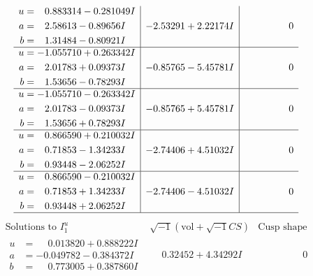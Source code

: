 \documentclass[1p]{elsarticle_modified}
\theoremstyle{definition}
\newcommand{\I}{\sqrt{-1}}
\begin{document}
$$\begin{array}{c|c|c}
\begin{aligned}
u &= \phantom{-}0.883314 - 0.281049 I \\
a &= \phantom{-}2.58613 - 0.89656 I \\
b &= \phantom{-}1.31484 - 0.80921 I\end{aligned}
 & -2.53291 + 2.22174 I & \phantom{-0.000000 } 0 \\ \hline\begin{aligned}
u &= -1.055710 + 0.263342 I \\
a &= \phantom{-}2.01783 + 0.09373 I \\
b &= \phantom{-}1.53656 - 0.78293 I\end{aligned}
 & -0.85765 - 5.45781 I & \phantom{-0.000000 } 0 \\ \hline\begin{aligned}
u &= -1.055710 - 0.263342 I \\
a &= \phantom{-}2.01783 - 0.09373 I \\
b &= \phantom{-}1.53656 + 0.78293 I\end{aligned}
 & -0.85765 + 5.45781 I & \phantom{-0.000000 } 0 \\ \hline\begin{aligned}
u &= \phantom{-}0.866590 + 0.210032 I \\
a &= \phantom{-}0.71853 - 1.34233 I \\
b &= \phantom{-}0.93448 - 2.06252 I\end{aligned}
 & -2.74406 + 4.51032 I & \phantom{-0.000000 } 0 \\ \hline\begin{aligned}
u &= \phantom{-}0.866590 - 0.210032 I \\
a &= \phantom{-}0.71853 + 1.34233 I \\
b &= \phantom{-}0.93448 + 2.06252 I\end{aligned}
 & -2.74406 - 4.51032 I & \phantom{-0.000000 } 0\\
 \hline 
 \end{array}$$\newpage$$\begin{array}{c|c|c}  
\text{Solutions to }I^u_{1}& \I (\text{vol} + \sqrt{-1}CS) & \text{Cusp shape}\\
 \hline 
\begin{aligned}
u &= \phantom{-}0.013820 + 0.888222 I \\
a &= -0.049782 - 0.384372 I \\
b &= \phantom{-}0.773005 + 0.387860 I\end{aligned}
 & \phantom{-}0.32452 + 4.34292 I & \phantom{-0.000000 } 0 \\ \hline\begin{aligned}

\end{aligned}
\end{array}$$
\end{document}
